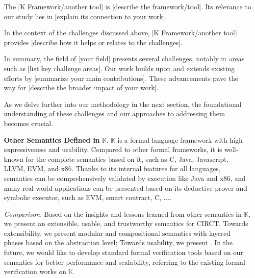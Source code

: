The [K Framework/another tool] is [describe the framework/tool]. Its relevance to our study lies in [explain its connection to your work].

In the context of the challenges discussed above, [K Framework/another tool] provides [describe how it helps or relates to the challenges].

In summary, the field of [your field] presents several challenges, notably in areas such as [list key challenge areas]. Our work builds upon and extends existing efforts by [summarize your main contributions]. These advancements pave the way for [describe the broader impact of your work].

As we delve further into our methodology in the next section, the foundational understanding of these challenges and our approaches to addressing them becomes crucial.



 \textbf{Other Semantics Defined in $\mathbb{K}$}. $\mathbb{K}$ is a formal language framework with high expressiveness and usability. Compared to other formal frameworks, it is well-known for the complete semantics based on it, such as C, Java, Javascript, LLVM, EVM, and x86. Thanks to its internal features for all languages, semantics can be comprehensively validated by execution like Java and x86, and many real-world applications can be presented based on its deductive prover and symbolic executor, such as EVM, smart contract, C, ....

 \textit{Comparison}. Based on the insights and lessons learned from other semantics in $\mathbb{K}$, we present an extensible, usable, and trustworthy semantics for CIRCT. Towards extensibility, we present modular and compositional semantics with layered phases based on the abstraction level; Towards usability, we present . In the future, we would like to develop standard formal verification tools based on our semantics for better performance and scalability, referring to the existing formal verification works on $\mathbb{K}$.







